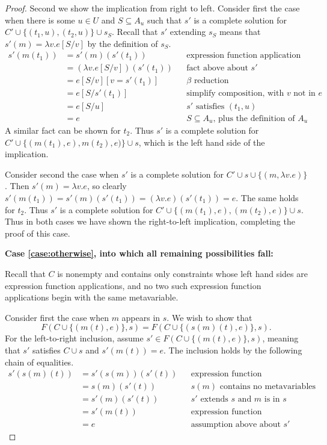 \documentclass{article}
\begin{document}
\begin{proof}
Second we show the implication from right to left.  Consider first the case when there is some $u\in U$ and $S\subseteq A_u$ such that $s'$ is a complete solution for $C'\cup\{(t_1,u),(t_2,u)\}\cup s_S$.  Recall that $s'$ extending $s_S$ means that $s'(m)=\lambda v.e[S/v]$ by the definition of $s_S$.
	\begin{align*}
		s'(m(t_1))	&=	s'(m)(s'(t_1))					&&	\text{expression function application structure}	\\
					&=	(\lambda v.e[S/v])(s'(t_1))		&&	\text{fact above about $s'$}	\\
					&=	e[S/v][v=s'(t_1)]				&&	\text{$\beta$ reduction}	\\
					&=	e[S/s'(t_1)]					&&	\text{simplify composition, with $v$ not in $e$}	\\
					&=	e[S/u]							&&	\text{$s'$ satisfies $(t_1,u)$}	\\
					&=	e								&&	\text{$S\subseteq A_u$, plus the definition of $A_u$}
	\end{align*}
A similar fact can be shown for $t_2$.  Thus $s'$ is a complete solution for $C'\cup\{(m(t_1),e),m(t_2),e)\}\cup s$, which is the left hand side of the implication.

Consider second the case when $s'$ is a complete solution for $C'\cup s\cup\{(m,\lambda v.e)\}$.  Then $s'(m)=\lambda v.e$, so clearly $s'(m(t_1))=s'(m)(s'(t_1))=(\lambda v.e)(s'(t_1))=e$.  The same holds for $t_2$.  Thus $s'$ is a complete solution for $C'\cup\{(m(t_1),e),(m(t_2),e)\}\cup s$.  Thus in both cases we have shown the right-to-left implication, completing the proof of this case.

{\bf Case \ref{case:otherwise}, into which all remaining possibilities fall:}

Recall that $C$ is nonempty and contains only constraints whose left hand sides are expression function applications, and no two such expression function applications begin with the same metavariable.

Consider first the case when $m$ appears in $s$.  We wish to show that
	$$	F(C\cup\{(m(t),e)\},s) = F(C\cup\{(s(m)(t),e)\},s).	$$
For the left-to-right inclusion, assume $s'\in F(C\cup\{(m(t),e)\},s)$, meaning that $s'$ satisfies $C\cup s$ and $s'(m(t))=e$.  The inclusion holds by the following chain of equalities.
	\begin{align*}
		s'(s(m)(t))	&=	s'(s(m))(s'(t))		&&	\text{expression function application structure}	\\
					&=	s(m)(s'(t))			&&	\text{$s(m)$ contains no metavariables}		\\
					&=	s'(m)(s'(t))		&&	\text{$s'$ extends $s$ and $m$ is in $s$}							\\
					&=	s'(m(t))			&&	\text{expression function application structure}	\\
					&=	e					&&	\text{assumption above about $s'$}
	\end{align*}


\end{proof}
\end{document}
